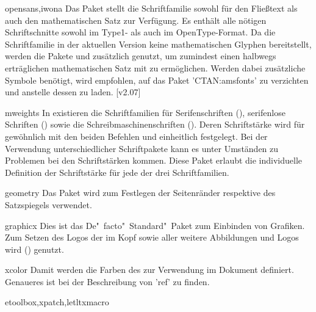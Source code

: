 \begin{packages}
\item[opensans,iwona]
  Das Paket  stellt die Schriftfamilie \OpenSans sowohl für 
  den Fließtext als auch den mathematischen Satz zur Verfügung. Es enthält alle 
  nötigen Schriftschnitte sowohl im Type1- als auch im OpenType-Format. Da die 
  Schriftfamilie in der aktuellen Version keine mathematischen Glyphen 
  bereitstellt, werden die Pakete  und  
  zusätzlich genutzt, um zumindest einen halbwegs erträglichen mathematischen 
  Satz mit \OpenSans zu ermöglichen. Werden dabei zusätzliche Symbole benötigt, 
  wird empfohlen, auf das Paket 'CTAN:amsfonts' zu verzichten 
  und anstelle dessen  zu laden.
  [v2.07]
\item[mweights]
  In  existieren die Schriftfamilien für Serifenschriften 
  (), serifenlose Schriften () sowie die 
  Schreibmaschinenschriften (). Deren Schriftstärke wird für 
  gewöhnlich mit den beiden Befehlen  und  
  einheitlich festgelegt. Bei der Verwendung unterschiedlicher Schriftpakete 
  kann es unter Umständen zu Problemen bei den Schriftstärken kommen. Diese 
  Paket erlaubt die individuelle Definition der Schriftstärke für jede der drei 
  Schriftfamilien.
\item[geometry]
  Das Paket wird zum Festlegen der Seitenränder respektive des Satzspiegels 
  verwendet.
\item[graphicx]
  Dies ist das De"~facto"~Standard"~Paket zum Einbinden von Grafiken. Zum 
  Setzen des Logos der \TnUD im Kopf sowie aller weitere Abbildungen und Logos 
  wird () genutzt.
\item[xcolor]
  Damit werden die Farben des \CDs zur Verwendung im Dokument definiert. 
  Genaueres ist bei der Beschreibung von 'ref' zu finden. 
\item[etoolbox,xpatch,letltxmacro]

\end{packages}
